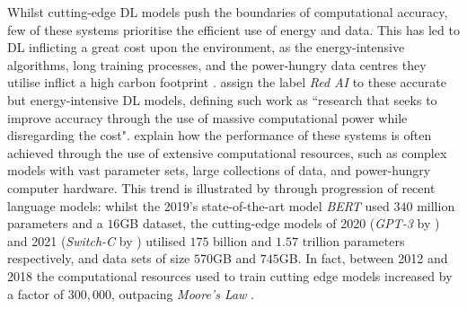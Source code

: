 \documentclass[a4paper, 11pt]{report}
\begin{document}
    Whilst cutting-edge DL models push the boundaries of computational accuracy, few of these systems prioritise the efficient use of energy and data. This has led to DL inflicting a great cost upon the environment, as the energy-intensive algorithms, long training processes, and the power-hungry data centres they utilise inflict a high carbon footprint \citep{lacoste-2019}. \citet{schwartz-2019} assign the label \emph{Red AI} to these accurate but energy-intensive DL models, defining such work as ``research that seeks to improve accuracy through the use of massive computational power while disregarding the cost". \citeauthor{schwartz-2019} explain how the performance of these systems is often achieved through the use of extensive computational resources, such as complex models with vast parameter sets, large collections of data, and power-hungry computer hardware. This trend is illustrated by \citet{bender-2021} through progression of recent language models: whilst the 2019's state-of-the-art model \emph{BERT} \citep{devlin-2018} used $340$ million parameters and a $16$GB dataset, the cutting-edge models of 2020 (\emph{GPT-3} by \citet{brown-2020}) and 2021 (\emph{Switch-C} by \citet{fedus-2021}) utilised $175$ billion and $1.57$ trillion parameters respectively, and data sets of size $570$GB and $745$GB. In fact, between 2012 and 2018 the computational resources used to train cutting edge models increased by a factor of $300,000$, outpacing \emph{Moore's Law} \citep{amodei-2018}.
\end{document}

